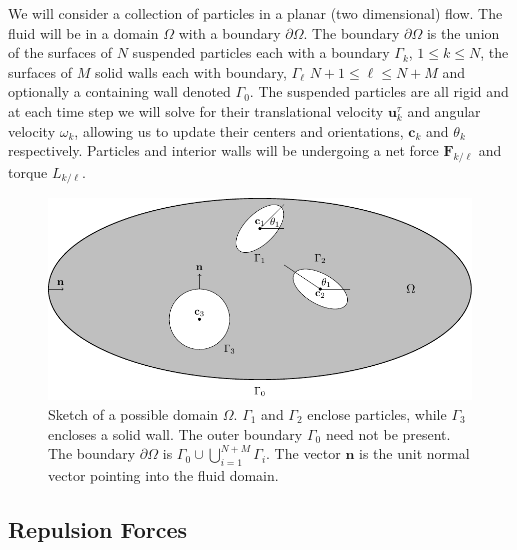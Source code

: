 \documentclass[preprint, 10pt]{elsarticle}
\begin{document}
We will consider a collection of particles in a planar (two dimensional) flow. The fluid will be in a domain $\Omega$ with a boundary $\partial\Omega$. The boundary $\partial\Omega$ is the union of the surfaces of $N$ suspended particles each with a boundary $\Gamma_k$, $1\leq k \leq N$, the surfaces of $M$ solid walls each with boundary, $\Gamma_\ell$ $N+1\leq\ell\leq N+ M$ and optionally a containing wall  denoted $\Gamma_0$. The suspended particles are all rigid and at each time step we will solve for their translational velocity $\mathbf{u}^{\tau}_k$ and angular velocity $\omega_k$, allowing us to update their centers and orientations, $\mathbf{c}_k$ and $\theta_k$ respectively. Particles and interior walls will be undergoing a net force $\mathbf{F}_{k/\ell}$  and torque $L_{k/\ell}$. 

\begin{figure}[!h]
\begin{center}
\includegraphics{figures/multiply_connected.pdf}
\end{center}
\caption{Sketch of a possible domain $\Omega$. $\Gamma_1$ and $\Gamma_2$ enclose particles, while $\Gamma_3$ encloses a solid wall. The outer boundary $\Gamma_0$ need not be present. The boundary $\partial\Omega$ is $\Gamma_0\cup\bigcup\limits_{i=1}^{N+M}\Gamma_i$. The vector $\mathbf{n}$ is the unit normal vector pointing into the fluid domain. }
\end{figure}
\subsection{Repulsion Forces}
\end{document}
